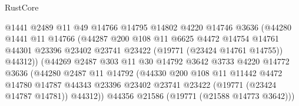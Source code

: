 \begin{lexlean}{RustCore}
\begin{coremodule}
                                @1441
                                @2489
                                @11
                                @49
                                @14766
                                @14795
                                @14802
                                @4220
                                @14746
                                @3636
                                (@44280
                                  @1441
                                  @11
                                  @14766
                                  (@44287
                                    @200
                                    @108
                                    @11
                                    @6625
                                    @4472
                                    @14754
                                    @14761
                                    @44301
                                    @23396
                                    @23402
                                    @23741
                                    @23422
                                    (@19771 (@23424 @14761 @14755))
                                    @44312))
                                (@44269
                                  @2487
                                  @303
                                  @11
                                  @30
                                  @14792
                                  @3642
                                  @3733
                                  @4220
                                  @14772
                                  @3636
                                  (@44280
                                    @2487
                                    @11
                                    @14792
                                    (@44330
                                      @200
                                      @108
                                      @11
                                      @11442
                                      @4472
                                      @14780
                                      @14787
                                      @44343
                                      @23396
                                      @23402
                                      @23741
                                      @23422
                                      (@19771 (@23424 @14787 @14781))
                                      @44312))
                                  @44356
                                  @21586
                                  (@19771 (@21588 @14773 @3642)))

\end{coremodule}
\end{lexlean}
